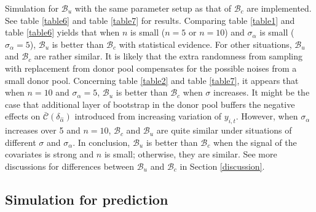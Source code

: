 \documentclass[11pt]{article}
\def\mc#1{\mathcal{#1}} %
\theoremstyle{definition}
\begin{document}
Simulation for $\mc{B}_u$ with the same parameter setup as that of $\mc{B}_c$ are implemented. See table \ref{table6} and table \ref{table7} for results. Comparing table \ref{table1}
 and table \ref{table6} yields that when $n$ is small ($n = 5$ or $n = 10$) and $\sigma_{\alpha}$ is small ($\sigma_{\alpha}=5$), $\mc{B}_u$ is better than $\mc{B}_c$ with statistical evidence. For other situations, $\mc{B}_u$  and $\mc{B}_c$  are rather similar. It is likely that the extra randomness from sampling with replacement from donor pool compensates for the possible noises from a small donor pool. Concerning  table \ref{table2} and table \ref{table7}, it appears that when $n = 10$ and $\sigma_{\alpha}=5$, $\mc{B}_u$ is better than  $\mc{B}_c$  when $\sigma$ increases. It might be the case that additional layer of bootstrap in the donor pool buffers the negative effects on $\bar{\mc{C}}(\delta_{\hat{\alpha}})$  introduced from increasing variation of $y_{i,t}$. However, when $\sigma_{\alpha}$ increases over 5 and $n = 10$,  $\mc{B}_c$ and $\mc{B}_u$ are quite similar under  situations of different $\sigma$ and $\sigma_{\alpha}$. In conclusion, $\mc{B}_u$ is better than $\mc{B}_c$ when the signal of the covariates is strong and $n$ is small; otherwise, they are similar. See more discussions for differences between $\mc{B}_u$ and $\mc{B}_c$ in Section \ref{discussion}. 



\subsection{Simulation for prediction}
\label{simulationforprediction}
\end{document}
